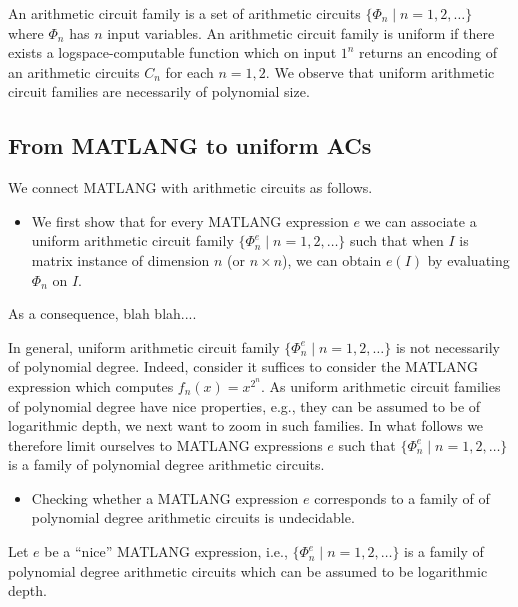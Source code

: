 An arithmetic circuit family is a set of arithmetic circuits $\{\Phi_n\mid n=1,2,\ldots\}$ where $\Phi_n$ has $n$ input variables. An arithmetic circuit family is uniform if there exists a logspace-computable function
which on input $1^n$ returns an encoding of an arithmetic circuits $C_n$ for each $n=1,2$. We observe that
uniform arithmetic circuit families are necessarily of polynomial size.

\subsection{From MATLANG to uniform ACs}
We connect MATLANG with arithmetic circuits as follows.
\begin{itemize}
	\item We first show that for every MATLANG expression $e$ we can associate a uniform arithmetic circuit family $\{\Phi_n^e\mid n=1,2,\ldots\}$ such that when $I$ is matrix instance of dimension $n$ (or $n\times n$), we can obtain $e(I)$ by evaluating $\Phi_n$ on $I$. 
\end{itemize}
As a consequence, blah blah....

In general, uniform arithmetic circuit family $\{\Phi_n^e\mid n=1,2,\ldots\}$ is not necessarily of polynomial degree. Indeed, consider it suffices to consider the MATLANG expression which computes
$f_n(x)=x^{2^n}$. 
As uniform arithmetic circuit families of polynomial degree have nice properties, e.g., they can be assumed to be of logarithmic depth, we next want to zoom in such families. In what follows we therefore limit ourselves to MATLANG expressions $e$ such that $\{\Phi_n^e\mid n=1,2,\ldots\}$ is a family of polynomial degree arithmetic circuits.

\begin{itemize}
	\item Checking whether a MATLANG expression $e$ corresponds to a family of of polynomial degree arithmetic circuits is undecidable. 
\end{itemize}

Let $e$ be a ``nice'' MATLANG expression, i.e.,  $\{\Phi_n^e\mid n=1,2,\ldots\}$ is a family of polynomial degree arithmetic circuits which can be assumed to be logarithmic depth. 



